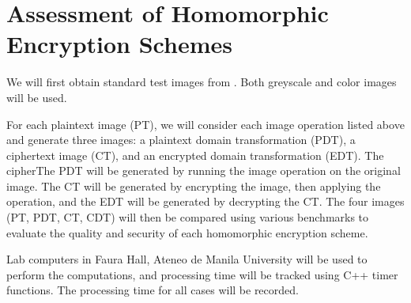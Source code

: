 \section{Assessment of Homomorphic Encryption Schemes}

We will first obtain standard test images from \cite{gonzalez_image_nodate}. Both greyscale and color images will be used.

For each plaintext image (PT), we will consider each image operation listed above and generate three images: a plaintext domain transformation (PDT), a ciphertext image (CT), and an encrypted domain transformation (EDT). The cipherThe PDT will be generated by running the image operation on the original image. The CT will be generated by encrypting the image, then applying the operation, and the EDT will be generated by decrypting the CT. The four images (PT, PDT, CT, CDT) will then be compared using various benchmarks to evaluate the quality and security of each homomorphic encryption scheme.

Lab computers in Faura Hall, Ateneo de Manila University will be used to perform the computations, and processing time will be tracked using C++ timer functions.
The processing time for all cases will be recorded.


